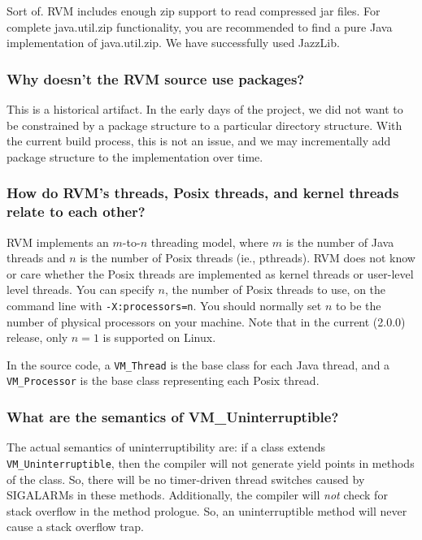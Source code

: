 Sort of.  RVM includes enough zip support to read compressed jar files.
For complete java.util.zip functionality, you are recommended to find 
a pure Java implementation of java.util.zip.  We have successfully used
JazzLib. 

\subsubsection{Why doesn't the RVM source use packages?}

This is a historical artifact.  In the early days of the project, we did
not want to be constrained by a package structure to a particular
directory structure.  With the current build process, this is not an
issue, and we may incrementally add package structure to the
implementation over time.

\subsubsection{How do RVM's threads, Posix threads, and kernel
threads relate to each other?}

RVM implements an $m$-to-$n$ threading model, where $m$ is the number of 
Java threads and $n$ is the number of Posix threads (ie., pthreads).  RVM
does not know or care whether the Posix threads are implemented as kernel
threads or user-level level threads.  You can specify $n$, the number of
Posix threads to use, on the command line with {\tt -X:processors=n}.
You should normally set $n$ to be the number of physical processors on
your machine.  Note that in the current (2.0.0) release, only $n=1$ is
supported on Linux.

In the source code, a {\tt VM\_Thread} is the base class for each Java
thread, and a {\tt VM\_Processor} is the base class representing each
Posix thread.  

\subsubsection{What are the semantics of VM\_Uninterruptible?}

The actual semantics of uninterruptibility are: if a class 
extends {\tt VM\_Uninterruptible}, then the compiler will not
generate yield points in methods of the class.  So, there will be no
timer-driven thread switches caused by SIGALARMs in these methods.
Additionally, the compiler will {\em not} check for stack overflow in the
method prologue.  So, an uninterruptible method will never cause a stack
overflow trap.  

